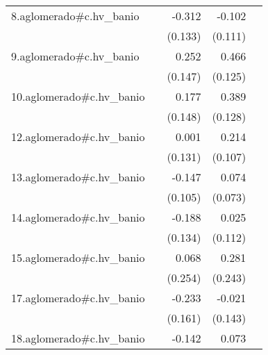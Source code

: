 {\begin{longtable}{l*{4}{D{.}{.}{-1}}}
\addlinespace
8.aglomerado#c.hv\_banio&                     &      -0.312\sym{*}  &      -0.102         &                     \\
            &                     &     (0.133)         &     (0.111)         &                     \\
\addlinespace
9.aglomerado#c.hv\_banio&                     &       0.252         &       0.466\sym{***}&                     \\
            &                     &     (0.147)         &     (0.125)         &                     \\
\addlinespace
10.aglomerado#c.hv\_banio&                     &       0.177         &       0.389\sym{**} &                     \\
            &                     &     (0.148)         &     (0.128)         &                     \\
\addlinespace
12.aglomerado#c.hv\_banio&                     &       0.001         &       0.214\sym{*}  &                     \\
            &                     &     (0.131)         &     (0.107)         &                     \\
\addlinespace
13.aglomerado#c.hv\_banio&                     &      -0.147         &       0.074         &                     \\
            &                     &     (0.105)         &     (0.073)         &                     \\
\addlinespace
14.aglomerado#c.hv\_banio&                     &      -0.188         &       0.025         &                     \\
            &                     &     (0.134)         &     (0.112)         &                     \\
\addlinespace
15.aglomerado#c.hv\_banio&                     &       0.068         &       0.281         &                     \\
            &                     &     (0.254)         &     (0.243)         &                     \\
\addlinespace
17.aglomerado#c.hv\_banio&                     &      -0.233         &      -0.021         &                     \\
            &                     &     (0.161)         &     (0.143)         &                     \\
\addlinespace
18.aglomerado#c.hv\_banio&                     &      -0.142         &       0.073         &                     \\

\end{longtable}}
